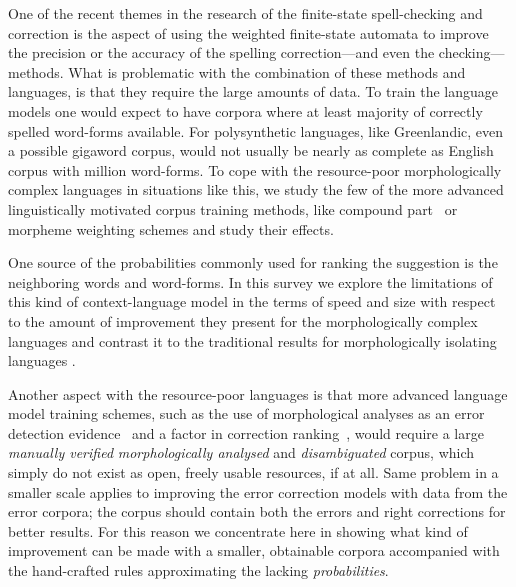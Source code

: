 \documentclass[a4paper,12pt]{article}
\begin{document}
One of the recent themes in the research of the finite-state spell-checking and
correction is the aspect of using the weighted finite-state automata to improve
the precision or the accuracy of the spelling correction---and even the
checking--- methods. What is problematic with the combination of these methods
and languages, is that they require the large amounts of data. To train the
language models one would expect to have corpora where at least majority of
correctly spelled word-forms available.  For polysynthetic languages, like
Greenlandic, even a possible gigaword corpus, would not usually be
nearly as complete as English corpus with million word-forms. To cope with the
resource-poor morphologically complex languages in situations like this, we
study the few of the more advanced linguistically motivated corpus training
methods, like compound part~\cite[]{pirinen/2009/nodalida} or morpheme
weighting schemes and study their effects.

One source of the probabilities commonly used
\cite[]{pirinen2012improving,otero/2007} for ranking the suggestion is the
neighboring words and word-forms. In this survey we explore the limitations of
this kind of context-language model in the terms of speed and size with respect
to the amount of improvement they present for the morphologically complex
languages and contrast it to the traditional results for morphologically
isolating languages \cite[]{mays/1991,wilcoxohearn2008realword}.

Another aspect with the resource-poor languages is that more advanced language
model training schemes, such as the use of morphological analyses as an error
detection evidence~\cite[]{mays/1991} and a factor in correction
ranking~\cite[]{otero/2007}, would require a large \emph{manually verified}
\emph{morphologically analysed} and \emph{disambiguated} corpus, which simply
do not exist as open, freely usable resources, if at all. Same problem in a
smaller scale applies to improving the error correction models with data from
the error corpora; the corpus should contain both the errors and right
corrections for better results. For this reason we concentrate here in showing
what kind of improvement can be made with a smaller, obtainable corpora
accompanied with the hand-crafted rules approximating the lacking
\emph{probabilities}.
\end{document}
